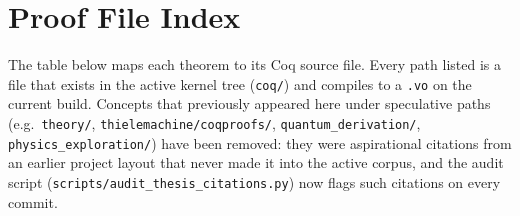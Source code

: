 \documentclass[11pt, a4paper]{report}
\theoremstyle{definition}
\theoremstyle{plain}
\begin{document}

\appendix
\chapter{Proof File Index}

The table below maps each theorem to its Coq source file. Every path listed is a file that exists in the active kernel tree (\texttt{coq/}) and compiles to a \texttt{.vo} on the current build. Concepts that previously appeared here under speculative paths (e.g.\ \texttt{theory/}, \texttt{thielemachine/coqproofs/}, \texttt{quantum\_derivation/}, \texttt{physics\_exploration/}) have been removed: they were aspirational citations from an earlier project layout that never made it into the active corpus, and the audit script (\texttt{scripts/audit\_thesis\_citations.py}) now flags such citations on every commit.
\end{document}
